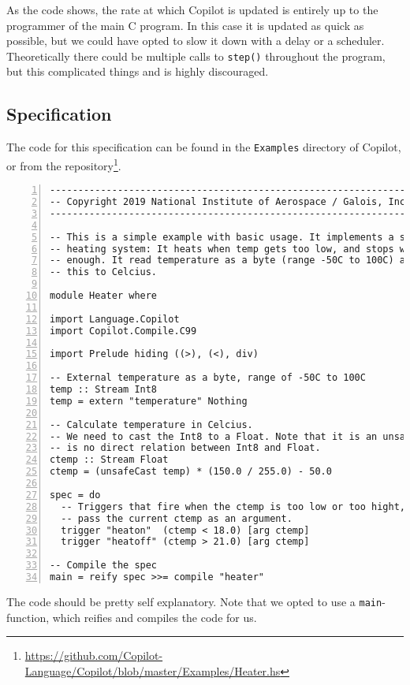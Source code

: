 As the code shows, the rate at which Copilot is updated is entirely up to the
programmer of the main C program. In this case it is updated as quick as
possible, but we could have opted to slow it down with a delay or a scheduler.
Theoretically there could be multiple calls to \texttt{step()} throughout the
program, but this complicated things and is highly discouraged.


\subsection{Specification}
The code for this specification can be found in the \texttt{Examples} directory
of Copilot, or from the
repository\footnote{\url{https://github.com/Copilot-Language/Copilot/blob/master/Examples/Heater.hs}}.

\begin{lstlisting}[language = Copilot, frame = single, numbers = left]
--------------------------------------------------------------------------------
-- Copyright 2019 National Institute of Aerospace / Galois, Inc.
--------------------------------------------------------------------------------

-- This is a simple example with basic usage. It implements a simple home
-- heating system: It heats when temp gets too low, and stops when it is high
-- enough. It read temperature as a byte (range -50C to 100C) and translates
-- this to Celcius.

module Heater where

import Language.Copilot
import Copilot.Compile.C99

import Prelude hiding ((>), (<), div)

-- External temperature as a byte, range of -50C to 100C
temp :: Stream Int8
temp = extern "temperature" Nothing

-- Calculate temperature in Celcius.
-- We need to cast the Int8 to a Float. Note that it is an unsafeCast, as there
-- is no direct relation between Int8 and Float.
ctemp :: Stream Float
ctemp = (unsafeCast temp) * (150.0 / 255.0) - 50.0

spec = do
  -- Triggers that fire when the ctemp is too low or too hight,
  -- pass the current ctemp as an argument.
  trigger "heaton"  (ctemp < 18.0) [arg ctemp]
  trigger "heatoff" (ctemp > 21.0) [arg ctemp]

-- Compile the spec
main = reify spec >>= compile "heater"
\end{lstlisting}
The code should be pretty self explanatory. Note that we opted to use a
\texttt{main}-function, which reifies and compiles the code for us.

